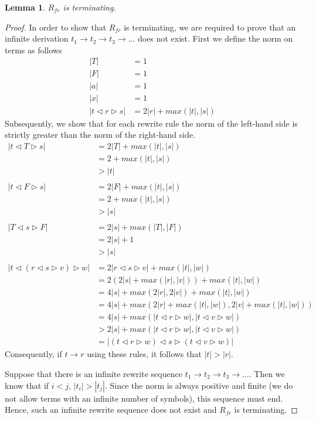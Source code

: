 \documentclass[a4paper,twoside,openright]{report}
\newcommand{\lef}{\ensuremath{\triangleleft}}
\newcommand{\rig}{\ensuremath{\triangleright}}
\newtheorem{lem}[theorem]{Lemma}
\begin{document}
\begin{lem}
$R_{fr}$ is terminating.
\end{lem}
\begin{proof}
In order to show that $R_{fr}$ is terminating, we are required to prove that an infinite derivation $t_1\to t_2\to t_3\to\ldots$ does not exist. First we define the norm on terms as follows
\begin{align*}
|T| &= 1\\
|F| &= 1\\
|a| &= 1\\
|x| &= 1\\
|t\lef r\rig s| &= 2|r|+max(|t|, |s|)
\end{align*}
Subsequently, we show that for each rewrite rule the norm of the left-hand side 
is strictly greater than the norm of the right-hand side.
\begin{align*}
|t\lef T\rig s|
&= 2|T| + max(|t|, |s|)\\
&= 2 + max(|t|, |s|)\\
&> |t|\\\\
|t\lef F\rig s|
&= 2|F| + max(|t|, |s|)\\
&= 2 + max(|t|, |s|)\\
&> |s|\\\\
|T\lef s\rig F|
&= 2|s| + max(|T|, |F|)\\
&= 2|s| + 1\\
&> |s|\\\\
|t\lef(r\lef s\rig v)\rig w|
&= 2|r\lef s\rig v| + max(|t|, |w|)\\
&= 2(2|s| + max(|r|, |v|)) + max(|t|, |w|)\\
&= 4|s| + max(2|r|, 2|v|) + max(|t|, |w|)\\
&= 4|s| + max(2|r| + max(|t|, |w|), 2|v| + max(|t|, |w|))\\
&= 4|s| + max(|t\lef r\rig w|, |t\lef v\rig w|)\\
&> 2|s| + max(|t\lef r\rig w|, |t\lef v\rig w|)\\
&= |(t\lef r\rig w)\lef s\rig(t\lef v\rig w)|
\end{align*}
Consequently, if $t\to r$ using these rules, it follows that $|t|>|r|$.

Suppose that there is an infinite rewrite sequence $t_1\to t_2\to t_3\to\ldots$. Then we know that if $i < j$, $|t_i|>|t_j|$. Since the norm is always positive and finite (we do not allow terms with an infinite number of symbols), this sequence must end. Hence, such an infinite rewrite sequence does not exist and $R_{fr}$ is terminating.
\end{proof}
\end{document}
